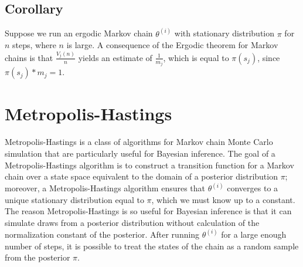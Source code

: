 \documentclass[12pt,twoside]{reedthesis}
\begin{document}
		\subsection*{Corollary}
		Suppose we run an ergodic Markov chain $\theta^{(i)}$ with stationary distribution $\pi$ for $n$ steps, where $n$ is large. A consequence of the Ergodic theorem for Markov chains is that $\frac{V_j(n)}{n}$ yields an estimate of $\frac{1}{m_j}$, which is equal to $\pi(s_j)$, since $\pi(s_j) * m_j = 1$.
	\section{Metropolis-Hastings}
			Metropolis-Hastings is a class of algorithms for Markov chain Monte Carlo simulation that are particularly useful for Bayesian inference. 
			The goal of a Metropolis-Hastings algorithm is to construct a transition function for a Markov chain over a state space equivalent to the domain of a posterior distribution $\pi$; moreover, a Metropolis-Hastings algorithm ensures that $\theta^{(i)}$ converges to a unique stationary distribution equal to $\pi$, which we must know up to a constant. 
			The reason Metropolis-Hastings is so useful for Bayesian inference is that it can simulate draws from a posterior distribution without calculation of the normalization constant of the posterior. After running $\theta^{(i)}$ for a large enough number of steps, it is possible to treat the states of the chain as a random sample from the posterior $\pi$.
			
			
\end{document}
